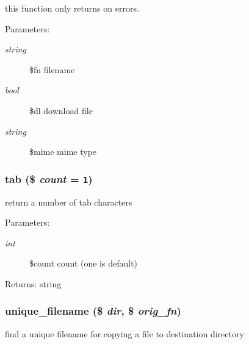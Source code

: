 this function only returns on errors. \begin{Desc}
\item[Parameters:]
\begin{description}
\item[{\em string}]\$fn filename \item[{\em bool}]\$dl download file \item[{\em string}]\$mime mime type \end{description}
\end{Desc}
\hypertarget{util_8inc_8php_74e38925e7162356a2ea14db32664c37}{
\subsubsection[{tab}]{\setlength{\rightskip}{0pt plus 5cm}tab (\$ {\em count} = {\tt 1})}}
\label{util_8inc_8php_74e38925e7162356a2ea14db32664c37}


return a number of tab characters

\begin{Desc}
\item[Parameters:]
\begin{description}
\item[{\em int}]\$count count (one is default) \end{description}
\end{Desc}
\begin{Desc}
\item[Returns:]string \end{Desc}
\hypertarget{util_8inc_8php_187670bae118aa2d4864c513a21e712d}{
\subsubsection[{unique\_\-filename}]{\setlength{\rightskip}{0pt plus 5cm}unique\_\-filename (\$ {\em dir}, \/  \$ {\em orig\_\-fn})}}
\label{util_8inc_8php_187670bae118aa2d4864c513a21e712d}


find a unique filename for copying a file to destination directory

